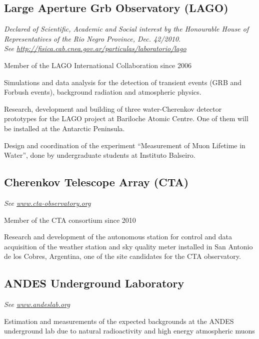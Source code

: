 \documentclass[11pt, a4paper]{article}
\renewenvironment{itemize}{
  \begin{list}{}{
    \setlength{\leftmargin}{0em}
    \setlength{\itemsep}{0.25em}
    \setlength{\parskip}{0pt}
    \setlength{\parsep}{.250em}
  }
}{
  \end{list}
}
\begin{document}
\subsection*{Large Aperture Grb Observatory (LAGO)}
{\emph{Declared of Scientific, Academic and Social interest by the Honourable
House of Representatives of the Rio Negro Province, Dec. 42/2010.}}\\
{\small{\textit{See
\href{http://fisica.cab.cnea.gov.ar/particulas/laboratorio/lago}
{http://fisica.cab.cnea.gov.ar/particulas/laboratorio/lago}}}}\\
\begin{itemize}
\item Member of the LAGO International Collaboration since 2006
\item Simulations and data analysis for the detection of transient events
(GRB and Forbush events), background radiation and atmospheric physics.
\item Research, development and building of three water-Cherenkov detector
prototypes for the LAGO project at Bariloche Atomic Centre. One of them will be
installed at the Antarctic Peninsula.
\item Design and coordination of the experiment ``Measurement of Muon Lifetime in
Water'', done by undergraduate students at Instituto Balseiro.
\end{itemize}

\subsection*{Cherenkov Telescope Array (CTA)}
{\small{\textit{See \href{http://www.cta-observatory.org}{www.cta-observatory.org}}}}
\begin{itemize}
\item Member of the CTA consortium since 2010
\item Research and development of the autonomous station for control and data
acquisition of the weather station and sky quality meter installed in San
Antonio de los Cobres, Argentina, one of the site candidates for the CTA
observatory.
\end{itemize}

\subsection*{ANDES Underground Laboratory}
{\small{\textit{See \href{http://www.andeslab.org}{www.andeslab.org}}}}
\begin{itemize}
\item Estimation and measurements of the expected backgrounds at the ANDES
underground lab due to natural radioactivity and high energy atmospheric muons
\end{itemize}
\end{document}
